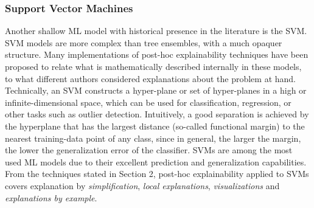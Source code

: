 \documentclass[final]{elsarticle}
\begin{document}
\subsubsection{Support Vector Machines}

Another shallow ML model with historical presence in the literature is the SVM. SVM models are more complex than tree ensembles, with a much opaquer structure. Many implementations of post-hoc explainability techniques have been proposed to relate what is mathematically described internally in these models, to what different authors considered explanations about the problem at hand. Technically, an SVM constructs a hyper-plane or set of hyper-planes in a high or infinite-dimensional space, which can be used for classification, regression, or other tasks such as outlier detection. Intuitively, a good separation is achieved by the hyperplane that has the largest distance (so-called functional margin) to the nearest training-data point of any class, since in general, the larger the margin, the lower the generalization error of the classifier. SVMs are among the most used ML models due to their excellent prediction and generalization capabilities. From the techniques stated in Section 2, post-hoc explainability applied to SVMs covers explanation by \textit{simplification}, \textit{local explanations}, \textit{visualizations} and \textit{explanations by example}.
\end{document}
